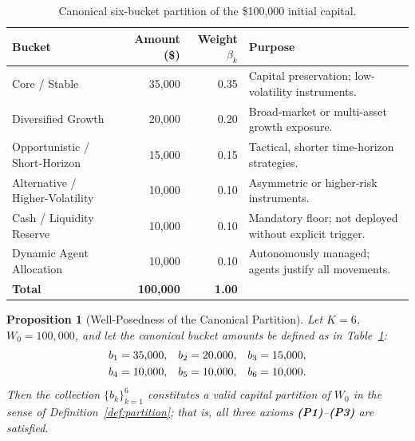 \documentclass[12pt,openany]{book}
\numberwithin{equation}{chapter}
\theoremstyle{plain}
\newtheorem{proposition}[theorem]{Proposition}
\theoremstyle{definition}
\theoremstyle{remark}
\numberwithin{equation}{chapter}
\theoremstyle{plain}
\begin{document}
\begin{table}[H]
\centering
\caption{Canonical six-bucket partition of the \$100{,}000 initial capital.}
\label{tab:buckets-canonical}
\small
\begin{tabularx}{\linewidth}{@{} l r r X @{}}
\toprule
\textbf{Bucket} & \textbf{Amount (\$)} & \textbf{Weight $\beta_k$}
  & \textbf{Purpose} \\
\midrule
Core / Stable               & 35{,}000 & 0.35
  & Capital preservation; low-volatility instruments. \\
Diversified Growth          & 20{,}000 & 0.20
  & Broad-market or multi-asset growth exposure. \\
Opportunistic / Short-Horizon & 15{,}000 & 0.15
  & Tactical, shorter time-horizon strategies. \\
Alternative / Higher-Volatility & 10{,}000 & 0.10
  & Asymmetric or higher-risk instruments. \\
Cash / Liquidity Reserve    & 10{,}000 & 0.10
  & Mandatory floor; not deployed without explicit trigger. \\
Dynamic Agent Allocation    & 10{,}000 & 0.10
  & Autonomously managed; agents justify all movements. \\
\midrule
\textbf{Total}              & \textbf{100{,}000} & \textbf{1.00} & \\
\bottomrule
\end{tabularx}
\end{table}

\begin{proposition}[Well-Posedness of the Canonical Partition]
\label{prop:partition-wp}
Let $K = 6$, $W_0 = 100{,}000$, and let the canonical bucket amounts
be defined as in Table~\ref{tab:buckets-canonical}:
\begin{align}
  b_1 &= 35{,}000, & b_2 &= 20{,}000, & b_3 &= 15{,}000, \notag\\
  b_4 &= 10{,}000, & b_5 &= 10{,}000, & b_6 &= 10{,}000. \notag
\end{align}
Then the collection $\{b_k\}_{k=1}^{6}$ constitutes a valid capital
partition of $W_0$ in the sense of Definition~\ref{def:partition};
that is, all three axioms \textbf{(P1)}--\textbf{(P3)} are satisfied.
\end{proposition}
\end{document}
